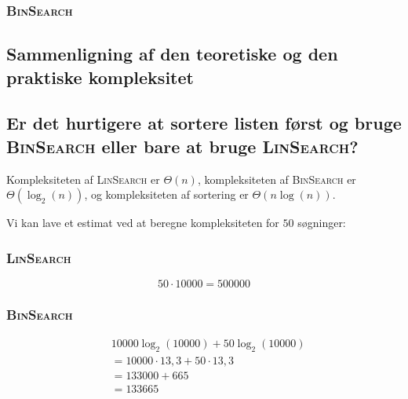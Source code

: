 \subsubsection{\textsc{BinSearch}}

\subsection{Sammenligning af den teoretiske og den praktiske kompleksitet}
\label{subsec:sammenligning-af-den-teoretiske-og-den-praktiske-kompleksitet}

\subsection{Er det hurtigere at sortere listen først og bruge \textsc{BinSearch} eller bare at bruge
    \textsc{LinSearch}?}
\label{subsec:er-det-hurtigere-at-sortere-listen-frst-og-bruge-binsearch-eller-bare-at-bruge-linsearch}

Kompleksiteten af \textsc{LinSearch} er \(\Theta(n)\), kompleksiteten af \textsc{BinSearch} er\(\Theta(\log_{2}(n))\),
og kompleksiteten af sortering er \(\Theta(n\log(n))\).

Vi kan lave et estimat ved at beregne kompleksiteten for \(50\) søgninger:

\subsubsection{\textsc{LinSearch}}

\begin{equation}
    50 \cdot 10000 = 500000
    \label{eq:equation16}
\end{equation}

\subsubsection{\textsc{BinSearch}}

\begin{equation}
    \begin{aligned}
         & 10000 \log_{2}(10000) + 50 \log_{2}(10000) \\
         & = 10000 \cdot 13,3 + 50 \cdot 13,3         \\
         & = 133000 + 665                             \\
         & = 133665
    \end{aligned}
    \label{eq:equation17}
\end{equation}

